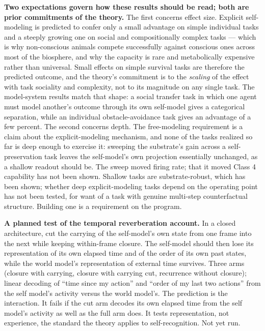 \documentclass[12pt]{article}
\begin{document}
\textbf{Two expectations govern how these results should be read; both are prior commitments of the theory.} The first concerns effect size. Explicit self-modeling is predicted to confer only a small advantage on simple individual tasks and a steeply growing one on social and compositionally complex tasks --- which is why non-conscious animals compete successfully against conscious ones across most of the biosphere, and why the capacity is rare and metabolically expensive rather than universal. Small effects on simple survival tasks are therefore the predicted outcome, and the theory's commitment is to the \emph{scaling} of the effect with task sociality and complexity, not to its magnitude on any single task. The model-system results match that shape: a social transfer task in which one agent must model another's outcome through its own self-model gives a categorical separation, while an individual obstacle-avoidance task gives an advantage of a few percent. The second concerns depth. The free-modeling requirement is a claim about the explicit-modeling mechanism, and none of the tasks realized so far is deep enough to exercise it: sweeping the substrate's gain across a self-preservation task leaves the self-model's own projection essentially unchanged, as a shallow readout should be. The sweep moved firing rate; that it moved Class 4 capability has not been shown. Shallow tasks are substrate-robust, which has been shown; whether deep explicit-modeling tasks depend on the operating point has not been tested, for want of a task with genuine multi-step counterfactual structure. Building one is a requirement on the program.

\textbf{A planned test of the temporal reverberation account.} In a closed architecture, cut the carrying of the self-model's own state from one frame into the next while keeping within-frame closure. The self-model should then lose its representation of its own elapsed time and of the order of its own past states, while the world model's representation of external time survives. Three arms (closure with carrying, closure with carrying cut, recurrence without closure); linear decoding of ``time since my action'' and ``order of my last two actions'' from the self model's activity versus the world model's. The prediction is the interaction. It fails if the cut arm decodes its own elapsed time from the self model's activity as well as the full arm does. It tests representation, not experience, the standard the theory applies to self-recognition. Not yet run.
\end{document}
